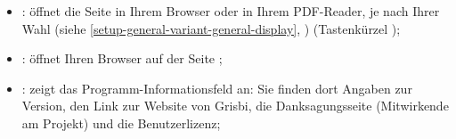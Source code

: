 \vspace{3mm}
\noindent
\begin{minipage}{.7\linewidth}
	\begin{itemize}[rightmargin=.6cm]
		\item {}: öffnet die Seite  in Ihrem Browser oder in Ihrem \gls{PDF}-Reader, je nach Ihrer Wahl (siehe \vref{setup-general-variant-general-display}, ) (Tastenkürzel );
		\item {}: öffnet Ihren Browser auf der Seite ;
		\item {}: zeigt das Programm-Informationsfeld an: Sie finden dort Angaben zur Version, den Link zur Website von Grisbi, die Danksagungsseite (Mitwirkende am Projekt) und die Benutzerlizenz;
	\end{itemize}
\end{minipage}
\hspace{10pt}	
